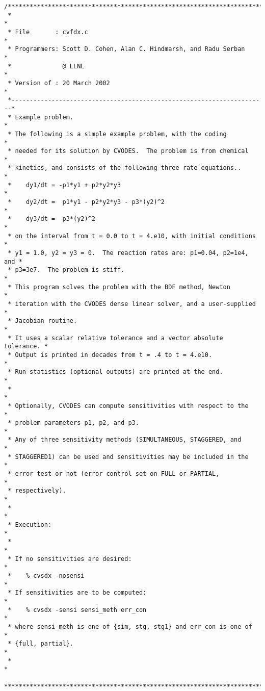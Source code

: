 \begin{verbatim}
/************************************************************************
 *                                                                      *
 * File       : cvfdx.c                                                 *
 * Programmers: Scott D. Cohen, Alan C. Hindmarsh, and Radu Serban      * 
 *              @ LLNL                                                  *
 * Version of : 20 March 2002                                           *
 *----------------------------------------------------------------------*
 * Example problem.                                                     *
 * The following is a simple example problem, with the coding           *
 * needed for its solution by CVODES.  The problem is from chemical     *
 * kinetics, and consists of the following three rate equations..       *
 *    dy1/dt = -p1*y1 + p2*y2*y3                                        *
 *    dy2/dt =  p1*y1 - p2*y2*y3 - p3*(y2)^2                            *
 *    dy3/dt =  p3*(y2)^2                                               *
 * on the interval from t = 0.0 to t = 4.e10, with initial conditions   *
 * y1 = 1.0, y2 = y3 = 0.  The reaction rates are: p1=0.04, p2=1e4, and *
 * p3=3e7.  The problem is stiff.                                       *
 * This program solves the problem with the BDF method, Newton          *
 * iteration with the CVODES dense linear solver, and a user-supplied   *
 * Jacobian routine.                                                    * 
 * It uses a scalar relative tolerance and a vector absolute tolerance. *
 * Output is printed in decades from t = .4 to t = 4.e10.               *
 * Run statistics (optional outputs) are printed at the end.            *
 *                                                                      *
 * Optionally, CVODES can compute sensitivities with respect to the     *
 * problem parameters p1, p2, and p3.                                   *
 * Any of three sensitivity methods (SIMULTANEOUS, STAGGERED, and       *
 * STAGGERED1) can be used and sensitivities may be included in the     *
 * error test or not (error control set on FULL or PARTIAL,             *
 * respectively).                                                       *
 *                                                                      *
 * Execution:                                                           *
 *                                                                      *
 * If no sensitivities are desired:                                     *
 *    % cvsdx -nosensi                                                  *
 * If sensitivities are to be computed:                                 *
 *    % cvsdx -sensi sensi_meth err_con                                 *
 * where sensi_meth is one of {sim, stg, stg1} and err_con is one of    *
 * {full, partial}.                                                     * 
 *                                                                      *
 ************************************************************************/


\end{verbatim}
